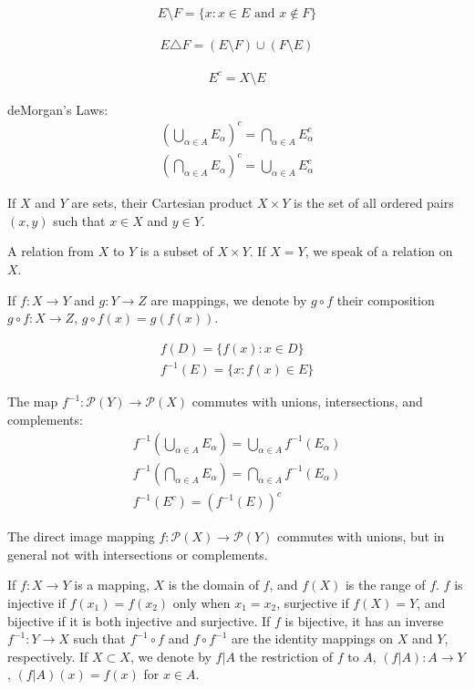 \begin{align}
E \setminus F = \{ x : x \in E \text{ and } x \notin F \}
\end{align}

\begin{align}
E \triangle F = (E \setminus F) \cup (F \setminus E)
\end{align}

\begin{align}
E^c = X \setminus E
\end{align}

deMorgan's Laws:
\begin{align}
(\bigcup_{\alpha \in A} E_{\alpha})^{c} = \bigcap_{\alpha \in A} E_{\alpha}^{c} \\
(\bigcap_{\alpha \in A} E_{\alpha})^{c} = \bigcup_{\alpha \in A} E_{\alpha}^{c}
\end{align}

If $X$ and $Y$ are sets, their Cartesian product $X \times Y$ is the set of all ordered pairs $(x, y)$ such that $x \in X$ and $y \in Y$. 

A relation from $X$ to $Y$ is a subset of $X \times Y$.
If $X=Y$, we speak of a relation on $X$.

If $f: X \to Y$ and $g: Y \to Z$ are mappings, we denote by $g \circ f$ their composition $g \circ f: X \to Z$, $g \circ f (x) = g(f(x))$.

\begin{align}
f(D) = \{ f(x) : x \in D \} \\
f^{-1}(E) = \{ x : f(x) \in E \}
\end{align}

The map $f^{-1}: \mathcal{P}(Y) \to \mathcal{P}(X)$ commutes with unions, intersections, and complements:
\begin{align}
f^{-1} (\bigcup_{\alpha \in A} E_{\alpha}) = \bigcup_{\alpha \in A} f^{-1}(E_{\alpha}) \\
f^{-1} (\bigcap_{\alpha \in A} E_{\alpha}) = \bigcap_{\alpha \in A} f^{-1}(E_{\alpha}) \\
f^{-1} (E^{c}) = (f^{-1}(E))^{c}
\end{align}

The direct image mapping $f: \mathcal{P}(X) \to \mathcal{P}(Y)$ commutes with unions, but in general not with intersections or complements.

If $f: X \to Y$ is a mapping, $X$ is the domain of $f$, and $f(X)$ is the range of $f$.
$f$ is injective if $f(x_1) = f(x_2)$ only when $x_1 = x_2$, surjective if $f(X) = Y$, and bijective if it is both injective and surjective.
If $f$ is bijective, it has an inverse $f^{-1}: Y \to X$ such that $f^{-1} \circ f$ and $f \circ f^{-1}$ are the identity mappings on $X$ and $Y$, respectively.
If $X \subset X$, we denote by $f|A$ the restriction of $f$ to $A$, $(f|A): A \to Y$, $(f|A)(x) = f(x)$ for $x \in A$.

